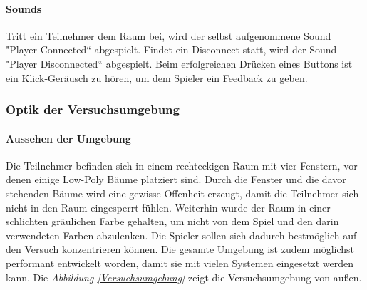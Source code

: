 \documentclass[a4paper,11pt]{article}%
\renewcommand{\\}{\vspace*{0.5\baselineskip} \newline}
\begin{document}
{\paragraph{Sounds}
Tritt ein Teilnehmer dem Raum bei, wird der selbst aufgenommene Sound "Player
Connected“ abgespielt. Findet ein Disconnect statt, wird der Sound "Player
Disconnected“ abgespielt. Beim erfolgreichen Drücken eines Buttons ist ein Klick-Geräusch zu hören, um dem Spieler ein Feedback zu geben. 

\newpage	
\subsubsection{Optik der Versuchsumgebung}
\paragraph{Aussehen der Umgebung}
Die Teilnehmer befinden sich in einem rechteckigen Raum mit vier Fenstern, vor denen einige Low-Poly Bäume platziert sind. Durch die Fenster und die davor stehenden Bäume wird eine gewisse Offenheit erzeugt, damit die Teilnehmer sich nicht in den Raum eingesperrt fühlen. Weiterhin wurde der Raum in einer schlichten gräulichen Farbe gehalten, um nicht von dem Spiel und den darin verwendeten Farben abzulenken. Die Spieler sollen sich dadurch bestmöglich auf den Versuch konzentrieren können. Die gesamte Umgebung ist zudem möglichst performant entwickelt worden, damit sie mit vielen Systemen eingesetzt werden kann. Die \textit{Abbildung \ref{Versuchsumgebung}} zeigt die Versuchsumgebung von außen.

}
\end{document}
